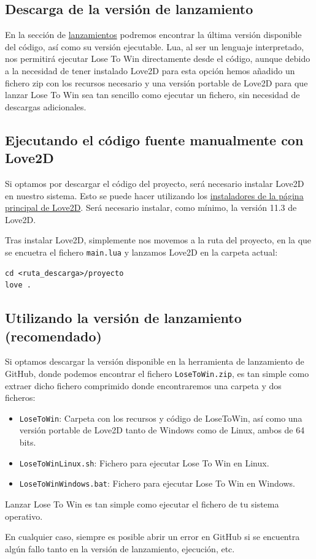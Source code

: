 \documentclass[12pt, spanish]{article}
\begin{document}
\subsection{Descarga de la versión de lanzamiento}

En la sección de \href{https://github.com/advy99/PLUD/releases}{lanzamientos} podremos encontrar la última versión disponible del código, así como su versión ejecutable. Lua, al ser un lenguaje interpretado, nos permitirá ejecutar Lose To Win directamente desde el código, aunque debido a la necesidad de tener instalado Love2D para esta opción hemos añadido un fichero zip con los recursos necesario y una versión portable de Love2D para que lanzar Lose To Win sea tan sencillo como ejecutar un fichero, sin necesidad de descargas adicionales.

\subsection{Ejecutando el código fuente manualmente con Love2D}

Si optamos por descargar el código del proyecto, será necesario instalar Love2D en nuestro sistema. Esto se puede hacer utilizando los \href{https://love2d.org/}{instaladores de la página principal de Love2D}. Será necesario instalar, como mínimo, la versión 11.3 de Love2D.

Tras instalar Love2D, simplemente nos movemos a la ruta del proyecto, en la que se encuetra el fichero \texttt{main.lua} y lanzamos Love2D en la carpeta actual:

\begin{lstlisting}
cd <ruta_descarga>/proyecto
love .
\end{lstlisting}

\subsection{Utilizando la versión de lanzamiento (recomendado)}

Si optamos descargar la versión disponible en la herramienta de lanzamiento de GitHub, donde podemos encontrar el fichero \texttt{LoseToWin.zip}, es tan simple como extraer dicho fichero comprimido donde encontraremos una carpeta y dos ficheros:

\begin{itemize}
	\item \texttt{LoseToWin}: Carpeta con los recursos y código de LoseToWin, así como una versión portable de Love2D tanto de Windows como de Linux, ambos de 64 bits.
	\item \texttt{LoseToWinLinux.sh}: Fichero para ejecutar Lose To Win en Linux.
	\item \texttt{LoseToWinWindows.bat}: Fichero para ejecutar Lose To Win en Windows.
\end{itemize}

Lanzar Lose To Win es tan simple como ejecutar el fichero de tu sistema operativo.

En cualquier caso, siempre es posible abrir un error en GitHub si se encuentra algún fallo tanto en la versión de lanzamiento, ejecución, etc.
\end{document}
